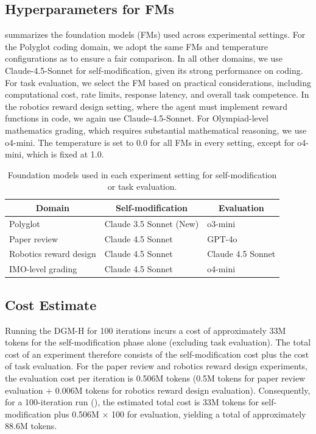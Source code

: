 \documentclass[]{fairmeta}
\begin{document}
\subsection{Hyperparameters for FMs}
\label{app:fm-hyperparam}

 summarizes the foundation models (FMs) used across experimental settings. For the Polyglot coding domain, we adopt the same FMs and temperature configurations as \citet{zhang2025darwin} to ensure a fair comparison. In all other domains, we use Claude-4.5-Sonnet for self-modification, given its strong performance on coding. For task evaluation, we select the FM based on practical considerations, including computational cost, rate limits, response latency, and overall task competence. In the robotics reward design setting, where the agent must implement reward functions in code, we again use Claude-4.5-Sonnet. For Olympiad-level mathematics grading, which requires substantial mathematical reasoning, we use o4-mini. The temperature is set to 0.0 for all FMs in every setting, except for o4-mini, which is fixed at 1.0.

\begin{table}[H]
\centering
\caption{Foundation models used in each experiment setting for self-modification or task evaluation.}
\label{tab:fm-hyperparam}
\begin{tabular}{@{}lll@{}}
\toprule
\multicolumn{1}{c}{\textbf{Domain}} & \multicolumn{1}{c}{\textbf{Self-modification}} & \multicolumn{1}{c}{\textbf{Evaluation}} \\ \midrule
Polyglot & Claude 3.5 Sonnet (New) & o3-mini \\
Paper review & Claude 4.5 Sonnet & GPT-4o \\
Robotics reward design & Claude 4.5 Sonnet & Claude 4.5 Sonnet \\
IMO-level grading & Claude 4.5 Sonnet & o4-mini \\ \bottomrule
\end{tabular}
\end{table}

\subsection{Cost Estimate}
\label{app:cost-estimate}
Running the DGM-H for 100 iterations incurs a cost of approximately 33M tokens for the self-modification phase alone (excluding task evaluation). The total cost of an experiment therefore consists of the self-modification cost plus the cost of task evaluation. For the paper review and robotics reward design experiments, the evaluation cost per iteration is 0.506M tokens (0.5M tokens for paper review evaluation + 0.006M tokens for robotics reward design evaluation). Consequently, for a 100-iteration run (), the estimated total cost is 33M tokens for self-modification plus 0.506M × 100 for evaluation, yielding a total of approximately 88.6M tokens.
\end{document}

